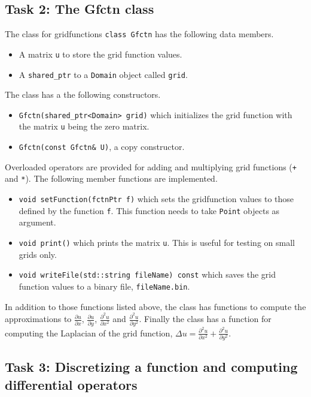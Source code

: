 \documentclass[a4paper,10pt]{article}
\begin{document}
\subsection*{Task 2: The Gfctn class}
The class for gridfunctions \texttt{class Gfctn} has the following data members.
\begin{itemize}
  \item
    A matrix \texttt{u} to store the grid function values.
  \item
    A \texttt{shared\_ptr} to a \texttt{Domain} object called \texttt{grid}.
\end{itemize}
The class has a the following constructors.
\begin{itemize}
  \item \texttt{Gfctn(shared\_ptr<Domain> grid)} which initializes the grid function with
    the matrix \texttt{u} being the zero matrix.
  \item \texttt{Gfctn(const Gfctn\& U)}, a copy constructor.
\end{itemize}
Overloaded operators are provided for adding and multiplying grid functions (\texttt{+} and 
\texttt{*}).
The following member functions are implemented.
\begin{itemize}
  \item
    \texttt{void setFunction(fctnPtr f)} which sets the gridfunction values to those
    defined by the function \texttt{f}. This function needs to take \texttt{Point}
    objects as argument.
  \item
    \texttt{void print()} which prints the matrix \texttt{u}.
    This is useful for testing on small grids only.
  \item
    \texttt{void writeFile(std::string fileName) const} which saves the grid function
    values to a binary file, \texttt{fileName.bin}.
\end{itemize}
In addition to those functions listed above, the class has functions to compute 
the approximations to $\tfrac{\partial u}{\partial x}$, $\tfrac{\partial u}{\partial y}$,
$\tfrac{\partial^2 u}{\partial x^2}$ and $\tfrac{\partial^2 u}{\partial y^2}$. Finally the class has a function for computing the Laplacian of the grid function, $\Delta u = \tfrac{\partial^2 u}{
  \partial x^2} + \tfrac{\partial^2 u}{\partial y^2}$.
    



\subsection*{Task 3: Discretizing a function and computing differential operators}
\end{document}
